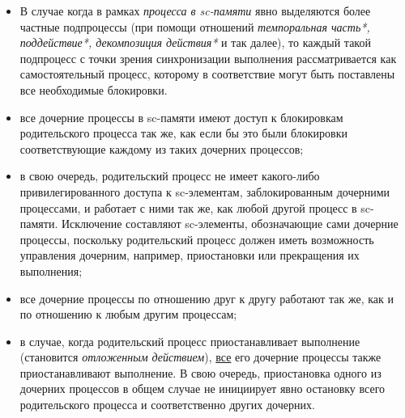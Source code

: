 \begin{frame}{}
\vspace{30pt}

\begin{itemize}
        \item В случае когда в рамках \textit{процесса в sc-памяти} явно выделяются более частные подпроцессы (при помощи отношений \textit{темпоральная часть*, поддействие*, декомпозиция действия*} и так далее), то каждый такой подпроцесс с точки зрения синхронизации выполнения рассматривается как самостоятельный процесс, которому в соответствие могут быть поставлены все необходимые блокировки.
	    \item все дочерние процессы в sc-памяти имеют доступ к блокировкам родительского процесса так же, как если бы это были блокировки соответствующие каждому из таких дочерних процессов;
		\item в свою очередь, родительский процесс не имеет какого-либо привилегированного доступа к sc-элементам, заблокированным дочерними процессами, и работает с ними так же, как любой другой процесс в sc-памяти. Исключение составляют sc-элементы, обозначающие сами дочерние процессы, поскольку родительский процесс должен иметь возможность управления дочерним, например, приостановки или прекращения их выполнения;
  \end{itemize}
  \end{frame}

  \begin{frame}{}
      \begin{itemize}
        \item все дочерние процессы по отношению друг к другу работают так же, как и по отношению к любым другим процессам; 
        \item в случае, когда родительский процесс приостанавливает выполнение (становится \textit{отложенным действием}), \uline{все} его дочерние процессы также приостанавливают выполнение. В свою очередь, приостановка одного из дочерних процессов в общем случае не инициирует явно остановку всего родительского процесса и соответственно других дочерних.
		\end{itemize}
\end{frame}

